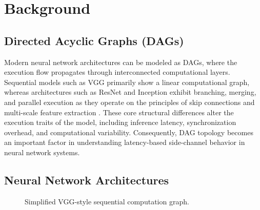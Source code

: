 \documentclass[conference]{IEEEtran}
\begin{document}
\section{Background}

\subsection{Directed Acyclic Graphs (DAGs)}
Modern neural network architectures can be modeled as DAGs, where the execution flow propagates through interconnected computational layers. Sequential models such as VGG primarily show a linear computational graph, whereas architectures such as ResNet and Inception exhibit branching, merging, and parallel execution as they operate on the principles of skip connections and multi-scale feature extraction \cite{resnet,inceptionv3}. These core structural differences alter the execution traits of the model, including inference latency, synchronization overhead, and computational variability. Consequently, DAG topology becomes an important factor in understanding latency-based side-channel behavior in neural network systems.

\subsection{Neural Network Architectures}




\begin{figure}[t]
\centering
{}
\caption{Simplified VGG-style sequential computation graph.}
\label{fig:vgg}
\end{figure}
\end{document}
